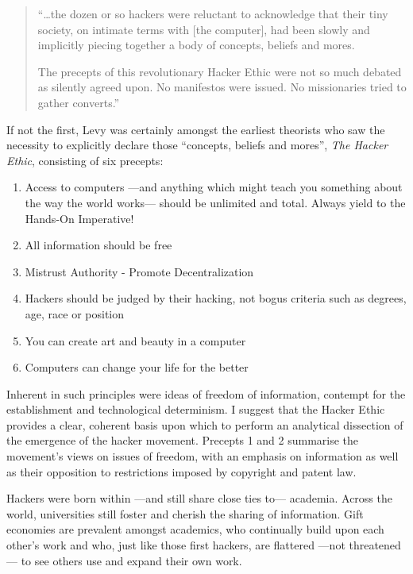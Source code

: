 \begin{quotation}
``\ldots the dozen or so hackers were reluctant to acknowledge that their tiny society, on intimate terms with [the computer], had been slowly and implicitly piecing together a body of concepts, beliefs and mores.

The precepts of this revolutionary Hacker Ethic were not so much debated as silently agreed upon. No manifestos were issued. No missionaries tried to gather converts.''
\end{quotation}

\noindent
If not the first, Levy was certainly amongst the earliest theorists who saw the necessity to explicitly declare those ``concepts, beliefs and mores'', \textit{The Hacker Ethic}, consisting of six precepts:

\begin{enumerate}
\item Access to computers ---and anything which might teach you something about the way the world works--- should be unlimited and total. Always yield to the Hands-On Imperative!
\item All information should be free
\item Mistrust Authority - Promote Decentralization
\item Hackers should be judged by their hacking, not bogus criteria such as degrees, age, race or position
\item You can create art and beauty in a computer
\item Computers can change your life for the better
\end{enumerate}

\noindent
Inherent in such principles were ideas of freedom of information, contempt for the establishment and technological determinism. I suggest that the Hacker Ethic provides a clear, coherent basis upon which to perform an analytical dissection of the emergence of the hacker movement. Precepts 1 and 2 summarise the movement's views on issues of freedom, with an emphasis on information as well as their opposition to restrictions imposed by copyright and patent law.

Hackers were born within ---and still share close ties to--- academia. Across the world, universities still foster and cherish the sharing of information. Gift economies are prevalent amongst academics, who continually build upon each other's work and who, just like those first hackers, are flattered ---not threatened--- to see others use and expand their own work.

